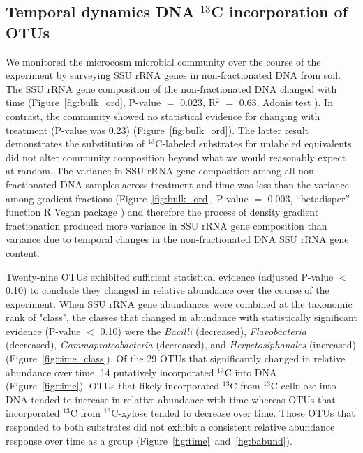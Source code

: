 \subsection{Temporal dynamics DNA $^{13}$C incorporation of OTUs}
We monitored the microcosm microbial community over the course of the
experiment by surveying SSU rRNA genes in non-fractionated DNA from soil. The
SSU rRNA gene composition of the non-fractionated DNA changed with time
(Figure~\ref{fig:bulk_ord}, P-value $=$ 0.023, R$^{2}$ $=$ 0.63, Adonis test
\citep{Anderson2001a}). In contrast, the community showed no statistical
evidence for changing with treatment (P-value was 0.23)
(Figure~\ref{fig:bulk_ord}). The latter result demonstrates the substitution of
$^{13}$C-labeled substrates for unlabeled equivalents did not alter community
composition beyond what we would reasonably expect at random. The variance in
SSU rRNA gene composition among all non-fractionated DNA samples across
treatment and time was less than the variance among gradient fractions
(Figure~\ref{fig:bulk_ord}, P-value $=$ 0.003, “betadisper” function R Vegan
package \citep{oksanen2007vegan}) and therefore the process of density gradient
fractionation produced more variance in SSU rRNA gene composition than variance
due to temporal changes in the non-fractionated DNA SSU rRNA gene content.

Twenty-nine OTUs exhibited sufficient statistical evidence (adjusted P-value
$<$ 0.10) to conclude they changed in relative abundance over the
course of the experiment. When SSU rRNA gene abundances were combined at
the taxonomic rank of "class", the classes that changed in abundance with
statistically significant evidence (P-value $<$ 0.10) were the
\textit{Bacilli} (decreased), \textit{Flavobacteria} (decreased),
\textit{Gammaproteobacteria} (decreased), and \textit{Herpetosiphonales}
(increased) (Figure~\ref{fig:time_class}). Of the 29 OTUs that
significantly changed in relative abundance over time, 14 putatively
incorporated $^{13}$C into DNA (Figure~\ref{fig:time}). OTUs that likely
incorporated $^{13}$C from $^{13}$C-cellulose into DNA tended to increase
in relative abundance with time whereas OTUs that incorporated $^{13}$C
from $^{13}$C-xylose tended to decrease over time. Those OTUs that
responded to both substrates did not exhibit a consistent relative
abundance response over time as a group
(Figure~\ref{fig:time}~and~\ref{fig:babund}).

